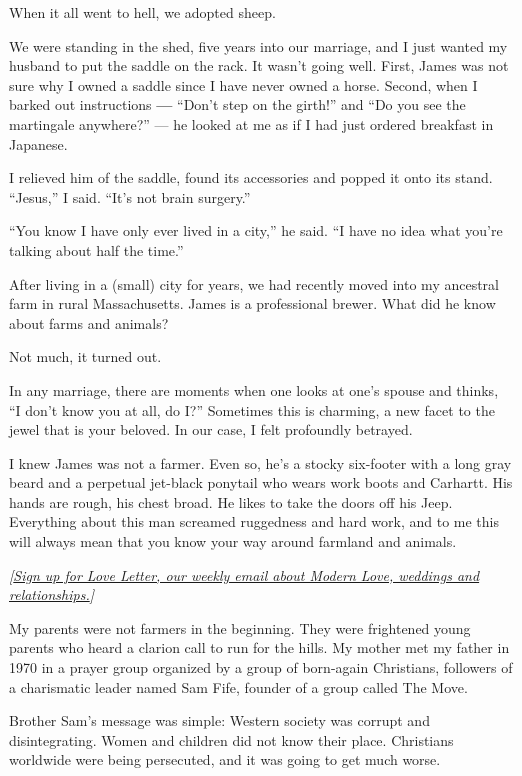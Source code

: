 When it all went to hell, we adopted sheep.

We were standing in the shed, five years into our marriage, and I just
wanted my husband to put the saddle on the rack. It wasn't going well.
First, James was not sure why I owned a saddle since I have never owned
a horse. Second, when I barked out instructions \textbf{---} ``Don't
step on the girth!'' and ``Do you see the martingale anywhere?'' --- he
looked at me as if I had just ordered breakfast in Japanese.

I relieved him of the saddle, found its accessories and popped it onto
its stand. ``Jesus,'' I said. ``It's not brain surgery.''

``You know I have only ever lived in a city,'' he said. ``I have no idea
what you're talking about half the time.''

After living in a (small) city for years, we had recently moved into my
ancestral farm in rural Massachusetts. James is a professional brewer.
What did he know about farms and animals?

Not much, it turned out.

In any marriage, there are moments when one looks at one's spouse and
thinks, ``I don't know you at all, do I?'' Sometimes this is charming, a
new facet to the jewel that is your beloved. In our case, I felt
profoundly betrayed.

I knew James was not a farmer. Even so, he's a stocky six-footer with a
long gray beard and a perpetual jet-black ponytail who wears work boots
and Carhartt. His hands are rough, his chest broad. He likes to take the
doors off his Jeep. Everything about this man screamed ruggedness and
hard work, and to me this will always mean that you know your way around
farmland and animals.

\emph{{[}}\href{https://www.nytimes.com/newsletters/love-letter}{\emph{Sign
up for Love Letter, our weekly email about Modern Love, weddings and
relationships.}}\emph{{]}}

My parents were not farmers in the beginning. They were frightened young
parents who heard a clarion call to run for the hills. My mother met my
father in 1970 in a prayer group organized by a group of born-again
Christians, followers of a charismatic leader named Sam Fife, founder of
a group called The Move.

Brother Sam's message was simple: Western society was corrupt and
disintegrating. Women and children did not know their place. Christians
worldwide were being persecuted, and it was going to get much worse.

